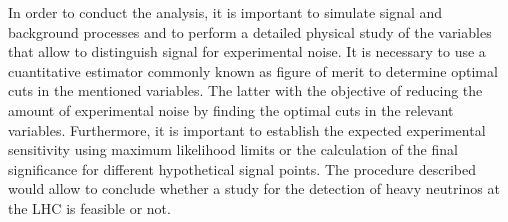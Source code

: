 In order to conduct the analysis, it is important to simulate signal and background processes and to perform a detailed physical study of the variables that allow to distinguish signal for experimental noise. It is necessary to use a cuantitative estimator commonly known as figure of merit to determine optimal cuts in the mentioned variables. The latter with the objective of reducing the amount of experimental noise by finding the optimal cuts in the relevant variables. Furthermore, it is important to establish the expected experimental sensitivity using maximum likelihood limits or the calculation of the final significance for different hypothetical signal points. The procedure described would allow to conclude whether a study for the detection of heavy neutrinos at the LHC is feasible or not.
